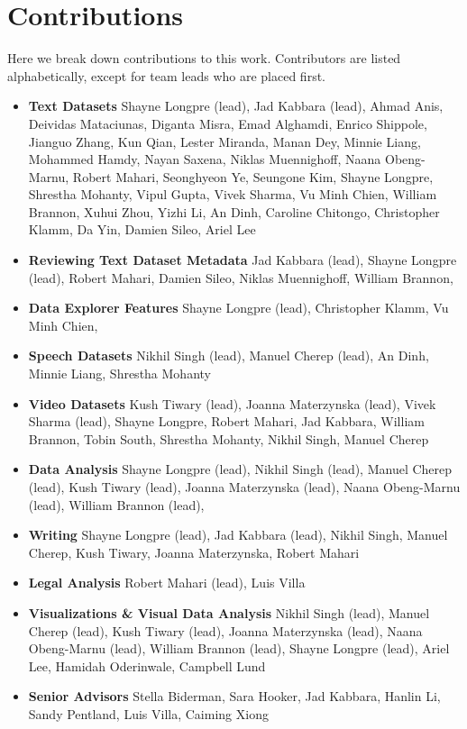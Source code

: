 \section{Contributions}
\label{app:contributions}
Here we break down contributions to this work. Contributors are listed alphabetically, except for team leads who are placed first.

\begin{itemize}

    \item \textbf{Text Datasets} \; Shayne Longpre (lead), Jad Kabbara (lead),  Ahmad Anis, Deividas Mataciunas, Diganta Misra, Emad Alghamdi, Enrico Shippole, Jianguo Zhang, Kun Qian, Lester Miranda, Manan Dey, Minnie Liang, Mohammed Hamdy, Nayan Saxena, Niklas Muennighoff, Naana Obeng-Marnu, Robert Mahari, Seonghyeon Ye, Seungone Kim, Shayne Longpre, Shrestha Mohanty, Vipul Gupta, Vivek Sharma, Vu Minh Chien, William Brannon, Xuhui Zhou, Yizhi Li, An Dinh, Caroline Chitongo, Christopher Klamm, Da Yin, Damien Sileo, Ariel Lee

    \item \textbf{Reviewing Text Dataset Metadata} \; Jad Kabbara (lead), Shayne Longpre (lead), Robert Mahari, Damien Sileo, Niklas Muennighoff, William Brannon,
    
    \item \textbf{Data Explorer Features} \; Shayne Longpre (lead), Christopher Klamm, Vu Minh Chien, 

    \item \textbf{Speech Datasets} Nikhil Singh (lead), Manuel Cherep (lead), An Dinh, Minnie Liang, Shrestha Mohanty

    \item \textbf{Video Datasets} \; Kush Tiwary (lead), Joanna Materzynska (lead), Vivek Sharma (lead), Shayne Longpre, Robert Mahari, Jad Kabbara, William Brannon, Tobin South, Shrestha Mohanty, Nikhil Singh, Manuel Cherep
    
    \item \textbf{Data Analysis} \; Shayne Longpre (lead), Nikhil Singh (lead), Manuel Cherep (lead), Kush Tiwary (lead), Joanna Materzynska (lead), Naana Obeng-Marnu (lead), William Brannon (lead), 

    \item \textbf{Writing} \; Shayne Longpre (lead), Jad Kabbara (lead), Nikhil Singh, Manuel Cherep, Kush Tiwary, Joanna Materzynska, Robert Mahari
    
    \item \textbf{Legal Analysis} \; Robert Mahari (lead), Luis Villa
    
    \item \textbf{Visualizations \& Visual Data Analysis} \; Nikhil Singh (lead), Manuel Cherep (lead), Kush Tiwary (lead), Joanna Materzynska (lead), Naana Obeng-Marnu (lead), William Brannon (lead), Shayne Longpre (lead), Ariel Lee, Hamidah Oderinwale, Campbell Lund

    \item \textbf{Senior Advisors} \; Stella Biderman, Sara Hooker, Jad Kabbara, Hanlin Li, Sandy Pentland, Luis Villa, Caiming Xiong
\end{itemize}